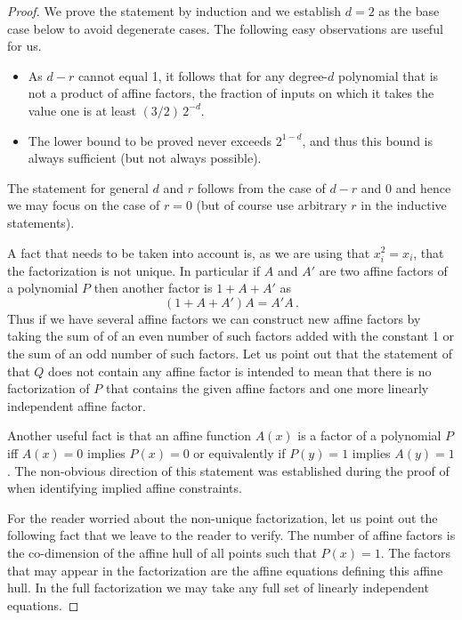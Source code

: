 \begin{proof}
We prove the statement by induction and
we establish $d=2$ as the base case below
to avoid degenerate cases.  The following
easy observations are useful for us.

\begin{itemize}
\item As $d-r$ cannot equal 1, it follows
that for any degree-$d$ polynomial that
is not a product of affine factors, the
fraction of inputs on which it takes
the value one is at least $(3/2)\, 2^{-d}$.

\item The lower bound to be proved never exceeds 
$2^{1-d}$, and thus this bound is
always sufficient (but not always possible).
\end{itemize}
The statement for general $d$ and $r$ follows
from the case of $d-r$ and $0$ and hence we
may focus on the case of $r=0$ (but of course
use arbitrary $r$ in the inductive statements).

A fact that needs to be taken into account is, as we
are using that $x_i^2=x_i$,
that the factorization is not unique.  In
particular if $A$ and $A'$ are
two affine factors of a polynomial $P$ then another
factor is $1+A+A'$
as 
$$
(1+A+A')A=A'A\,.
$$
Thus if we have several affine factors
we can construct new affine factors by taking
the sum of of an even number of such factors
added with the constant 1 or the sum of
an odd number of such factors. 
Let us point out that the statement
of  that $Q$ does not
contain any affine factor is intended to mean that there is no
factorization of $P$ that contains the given
affine factors and one more linearly independent
affine factor.

Another useful
fact is that an affine function $A(x)$ is a factor of 
a polynomial $P$
iff $A(x)=0$ implies $P(x)=0$ or equivalently
if $P(y)=1$ implies $A(y)=1$.  The non-obvious
direction of this statement was established during
the proof of 
when identifying implied affine constraints.

For the reader worried about the non-unique factorization,
let us point out the following fact that we leave to
the reader to verify.  The number of affine factors
is the co-dimension of the affine hull of all
points such that $P(x)=1$.  The factors that
may appear in the factorization are the affine equations
defining this affine hull.  In the full factorization
we may take any full set of linearly independent
equations.


\end{proof}
